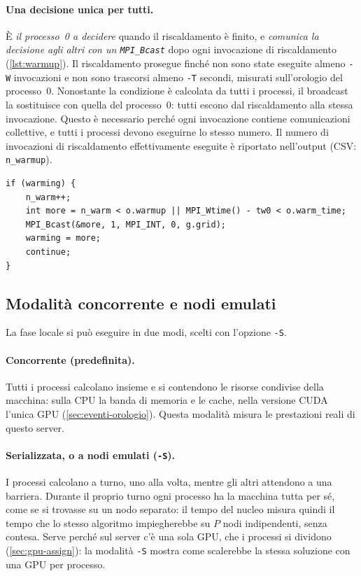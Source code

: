 \documentclass[11pt,a4paper]{article}
\begin{document}
\paragraph{Una decisione unica per tutti.} È \emph{il processo~0 a decidere}
quando il riscaldamento è finito, e \emph{comunica la decisione agli altri con
un \texttt{MPI\_Bcast}} dopo ogni invocazione di riscaldamento
(\cref{lst:warmup}). Il riscaldamento prosegue finché non sono state eseguite
almeno \texttt{-W} invocazioni e non sono trascorsi almeno \texttt{-T} secondi,
misurati sull'orologio del processo~0. Nonostante la condizione è calcolata da tutti i
processi, il broadcast la sostituisce con quella del processo~0: tutti
escono dal riscaldamento alla stessa invocazione. Questo è necessario perché
ogni invocazione contiene comunicazioni collettive, e tutti i processi devono
eseguirne lo stesso numero. Il numero di invocazioni di riscaldamento
effettivamente eseguite è riportato nell'output (CSV: \texttt{n\_warmup}).

\begin{lstlisting}[caption={Fine del riscaldamento decisa dal processo 0 (\texttt{main.c}).}, label={lst:warmup}]
if (warming) {
    n_warm++;
    int more = n_warm < o.warmup || MPI_Wtime() - tw0 < o.warm_time;
    MPI_Bcast(&more, 1, MPI_INT, 0, g.grid);
    warming = more;
    continue;
}
\end{lstlisting}

\subsection{Modalità concorrente e nodi emulati}\label{sec:modalita}

La fase locale si può eseguire in due modi, scelti con l'opzione \texttt{-S}.

\paragraph{Concorrente (predefinita).} Tutti i processi calcolano insieme e si
contendono le risorse condivise della macchina: sulla CPU la banda di memoria e
le cache, nella versione CUDA l'unica GPU (\cref{sec:eventi-orologio}). Questa
modalità misura le prestazioni reali di questo server.

\paragraph{Serializzata, o a nodi emulati (\texttt{-S}).} I processi calcolano a
turno, uno alla volta, mentre gli altri attendono a una barriera. Durante il
proprio turno ogni processo ha la macchina tutta per sé, come se si trovasse su
un nodo separato: il tempo del nucleo misura quindi il tempo che lo stesso
algoritmo impiegherebbe su $P$ nodi indipendenti, senza contesa. Serve perché sul
server c'è una sola GPU, che i processi si dividono (\cref{sec:gpu-assign}): la
modalità \texttt{-S} mostra come scalerebbe la stessa soluzione con una GPU per
processo.
\end{document}
